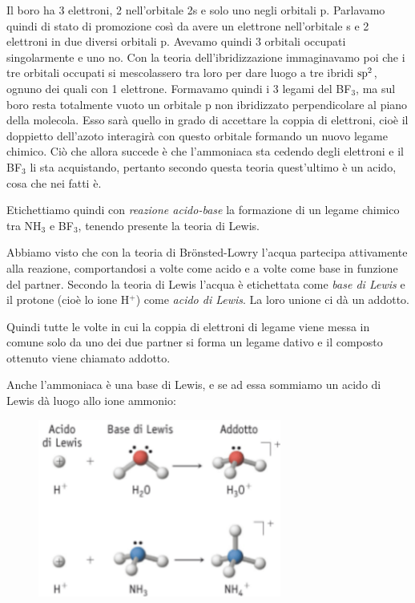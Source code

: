 Il boro ha 3 elettroni, 2 nell'orbitale 2s e solo uno negli orbitali p. Parlavamo quindi di stato di promozione così da avere un elettrone nell'orbitale s e 2 elettroni in due diversi orbitali p. Avevamo quindi 3 orbitali occupati singolarmente e uno no. Con la teoria dell'ibridizzazione immaginavamo poi che i tre orbitali occupati si mescolassero tra loro per dare luogo a tre ibridi $\rm sp^2$, ognuno dei quali con 1 elettrone. Formavamo quindi i 3 legami del BF$_3$, ma sul boro resta totalmente vuoto un orbitale p non ibridizzato perpendicolare al piano della molecola. Esso sarà quello in grado di accettare la coppia di elettroni, cioè il doppietto dell'azoto interagirà con questo orbitale formando un nuovo legame chimico. Ciò che allora succede è che l'ammoniaca sta cedendo degli elettroni e il BF$_3$ li sta acquistando, pertanto secondo questa teoria quest'ultimo è un acido, cosa che nei fatti è.

\vspace{0.2cm}Etichettiamo quindi con \textit{reazione acido-base} la formazione di un legame chimico tra NH$_3$ e BF$_3$, tenendo presente la teoria di Lewis.

\vspace{0.2cm}Abbiamo visto che con la teoria di  Br\"{o}nsted-Lowry l'acqua partecipa attivamente alla reazione, comportandosi a volte come acido e a volte come base in funzione del partner. Secondo la teoria di Lewis l'acqua è etichettata come \textit{base di Lewis} e il protone (cioè lo ione H$^+$) come \textit{acido di Lewis}. La loro unione ci dà un addotto.

Quindi tutte le volte in cui la coppia di elettroni di legame viene messa in comune solo da uno dei due partner si forma un legame dativo e il composto ottenuto viene chiamato addotto.

Anche l'ammoniaca è una base di Lewis, e se ad essa sommiamo un acido di Lewis dà luogo allo ione ammonio:

\begin{figure}[htp]
    \centering
    \includegraphics[width=8cm]{immagini/acidi_e_basi_di_lewis.png}
\end{figure}


